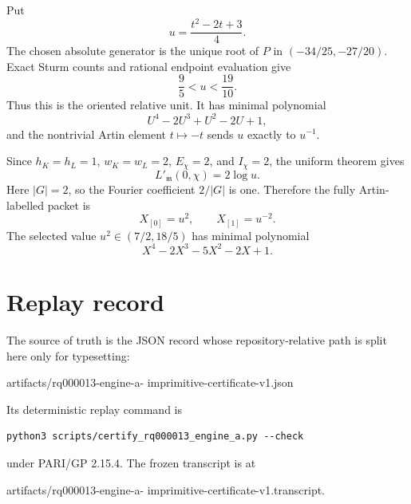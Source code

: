 \documentclass[11pt]{article}
\begin{document}
Put
\[
 u=\frac{t^2-2t+3}{4}.
\]
The chosen absolute generator is the unique root of \(P\) in
\((-34/25,-27/20)\).  Exact Sturm counts and rational endpoint
evaluation give
\[
 \frac95<u<\frac{19}{10}.
\]
Thus this is the oriented relative unit.  It has minimal polynomial
\[
 U^4-2U^3+U^2-2U+1,
\]
and the nontrivial Artin element \(t\mapsto-t\) sends \(u\) exactly to
\(u^{-1}\).

Since \(h_K=h_L=1\), \(w_K=w_L=2\), \(E_\chi=2\), and \(I_\chi=2\),
the uniform theorem gives
\[
 L'_{\mathfrak m}(0,\chi)=2\log u.
\]
Here \(|G|=2\), so the Fourier coefficient \(2/|G|\) is one.  Therefore
the fully Artin-labelled packet is
\[
 \boxed{X_{[0]}=u^2,\qquad X_{[1]}=u^{-2}.}
\]
The selected value \(u^2\in(7/2,18/5)\) has minimal polynomial
\[
 X^4-2X^3-5X^2-2X+1.
\]

\section*{Replay record}

The source of truth is the JSON record whose repository-relative path
is split here only for typesetting:
\begin{center}
\ttfamily\small
artifacts/rq000013-engine-a-\linebreak
imprimitive-certificate-v1.json
\end{center}
Its deterministic replay command is
\begin{verbatim}
python3 scripts/certify_rq000013_engine_a.py --check
\end{verbatim}
under PARI/GP 2.15.4.  The frozen transcript is at
\begin{center}
\ttfamily\small
artifacts/rq000013-engine-a-\linebreak
imprimitive-certificate-v1.transcript.
\end{center}
\end{document}
